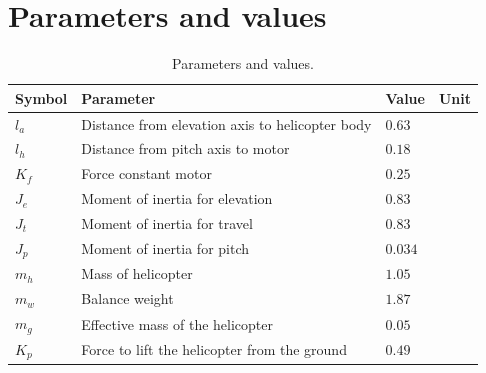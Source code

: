 \FloatBarrier

\section{Parameters and values}


\begin{table}[tbp]
	\centering
	\caption{Parameters and values.}
	\begin{tabular}{llll}
		\toprule
		Symbol & Parameter & Value & Unit \\
		\midrule
		$l_a$ & Distance from elevation axis to helicopter body & $0.63$  & \meter                      \\
		$l_h$ & Distance from pitch axis to motor               & $0.18$  & \meter                      \\
		$K_f$ & Force constant motor                            & $0.25$  & \newton\per\volt            \\
		$J_e$ & Moment of inertia for elevation                 & $0.83$  & \kilogram\usk\meter\squared \\
		$J_t$ & Moment of inertia for travel                    & $0.83$  & \kilogram\usk\meter\squared \\
		$J_p$ & Moment of inertia for pitch                     & $0.034$ & \kilogram\usk\meter\squared \\
		$m_h$ & Mass of helicopter                              & $1.05$  & \kilogram                   \\
		$m_w$ & Balance weight                                  & $1.87$  & \kilogram                   \\
		$m_g$ & Effective mass of the helicopter                & $0.05$  & \kilogram                   \\
		$K_p$ & Force to lift the helicopter from the ground    & $0.49$  & \newton                     \\
		\bottomrule
	\end{tabular}
\label{tab:parameters}
\end{table}
